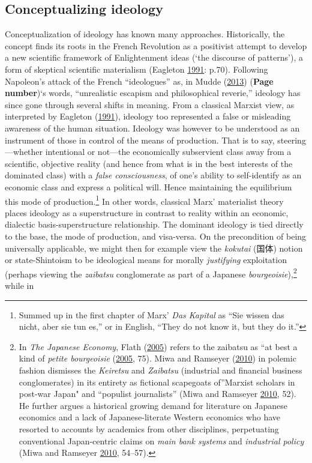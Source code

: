 \documentclass[10pt,british,A4paper,,openany]{memoir}
\begin{document}
\subsection{Conceptualizing ideology}\label{conceptualizing-ideology}

Conceptualization of ideology has known many approaches. Historically,
the concept finds its roots in the French Revolution as a positivist
attempt to develop a new scientific framework of Enlightenment ideas
(`the discourse of patterns'), a form of skeptical scientific
materialism (Eagleton
\protect\hyperlink{ref-eagleton_ideology:_1991}{1991}: p.70). Following
Napoleon's attack of the French ``ideologues'' as, in Mudde
(\protect\hyperlink{ref-mudde_oxford_2013}{2013}) (\textbf{Page
number})`s words, ``unrealistic escapism and philosophical reverie,''
ideology has since gone through several shifts in meaning. From a
classical Marxist view, as interpreted by Eagleton
(\protect\hyperlink{ref-eagleton_ideology:_1991}{1991}), ideology too
represented a false or misleading awareness of the human situation.
Ideology was however to be understood as an instrument of those in
control of the means of production. That is to say, steering---whether
intentional or not---the economically subservient class away from a
scientific, objective reality (and hence from what is in the best
interests of the dominated class) with a \emph{false consciousness}, of
one's ability to self-identify as an economic class and express a
political will. Hence maintaining the equilibrium this mode of
production.\footnote{Summed up in the first chapter of Marx' \emph{Das
  Kapital} as ``Sie wissen das nicht, aber sie tun es,'' or in English,
  ``They do not know it, but they do it.''} In other words, classical
Marx' materialist theory places ideology as a superstructure in contrast
to reality within an economic, dialectic basis-superstructure
relationship. The dominant ideology is tied directly to the base, the
mode of production, and visa-versa. On the precondition of being
universally applicable, we might then for example view the
\emph{kokutai} (国体) notion or state-Shintoism to be ideological means
for morally \emph{justifying} exploitation (perhaps viewing the
\emph{zaibatsu} conglomerate as part of a Japanese
\emph{bourgeoisie}),\footnote{In \emph{The Japanese Economy}, Flath
  (\protect\hyperlink{ref-flath_japanese_2005}{2005}) refers to the
  zaibatsu as ``at best a kind of \emph{petite bourgeoisie}
  (\protect\hyperlink{ref-flath_japanese_2005}{2005}, 75). Miwa and
  Ramseyer (\protect\hyperlink{ref-miwa_fable_2010}{2010}) in polemic
  fashion dismisses the \emph{Keiretsu} and \emph{Zaibatsu} (industrial
  and financial business conglomerates) in its entirety as fictional
  scapegoats of''Marxist scholars in post-war Japan" and ``populist
  journalists'' (Miwa and Ramseyer
  \protect\hyperlink{ref-miwa_fable_2010}{2010}, 52). He further argues
  a historical growing demand for literature on Japanese economics and a
  lack of Japanese-literate Western economics who have resorted to
  accounts by academics from other disciplines, perpetuating
  conventional Japan-centric claims on \emph{main bank systems} and
  \emph{industrial policy} (Miwa and Ramseyer
  \protect\hyperlink{ref-miwa_fable_2010}{2010}, 54--57).} while in
\end{document}
